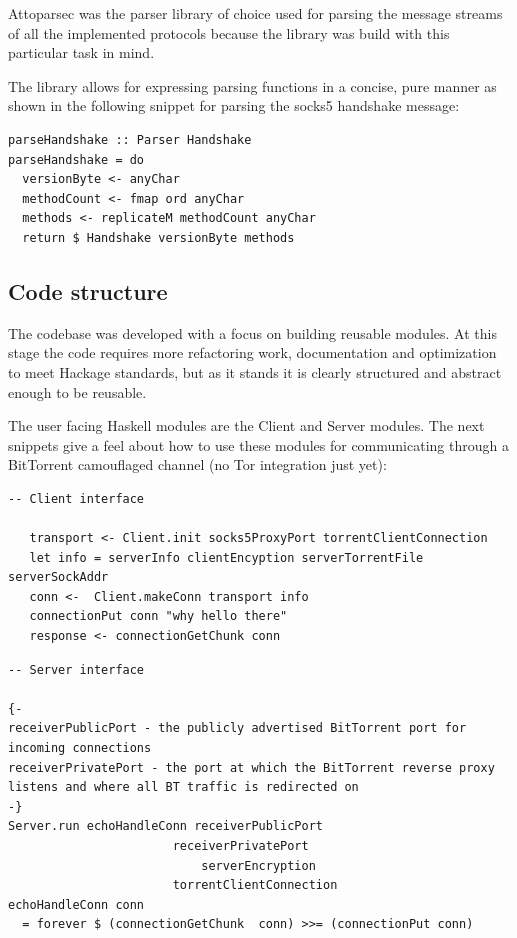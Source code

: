 \documentclass[11pt]{book} %
\begin{document}
Attoparsec was the parser library of choice used for parsing the message streams of all the implemented protocols because the library was build with this particular task in mind.

The library allows for expressing parsing functions in a concise, pure manner as shown in the following snippet for parsing the socks5 handshake message:

\begin{lstlisting}
parseHandshake :: Parser Handshake
parseHandshake = do
  versionByte <- anyChar
  methodCount <- fmap ord anyChar
  methods <- replicateM methodCount anyChar
  return $ Handshake versionByte methods
\end{lstlisting}

\subsection{Code structure}

The codebase was developed with a focus on building reusable modules. At this stage the code requires more refactoring work, documentation and optimization to meet Hackage standards, but as it stands it is clearly structured and abstract enough to be reusable.

The user facing Haskell modules are the Client and Server modules. The next snippets give a feel about how to use these modules for communicating through a BitTorrent camouflaged channel (no Tor integration just yet):

\begin{lstlisting}
-- Client interface

   transport <- Client.init socks5ProxyPort torrentClientConnection
   let info = serverInfo clientEncyption serverTorrentFile serverSockAddr
   conn <-  Client.makeConn transport info
   connectionPut conn "why hello there"
   response <- connectionGetChunk conn
\end{lstlisting}

\begin{lstlisting}
-- Server interface

{-
receiverPublicPort - the publicly advertised BitTorrent port for incoming connections
receiverPrivatePort - the port at which the BitTorrent reverse proxy listens and where all BT traffic is redirected on
-}
Server.run echoHandleConn receiverPublicPort
					   receiverPrivatePort
				           serverEncryption
					   torrentClientConnection	
echoHandleConn conn
  = forever $ (connectionGetChunk  conn) >>= (connectionPut conn)
\end{lstlisting}
\end{document}
